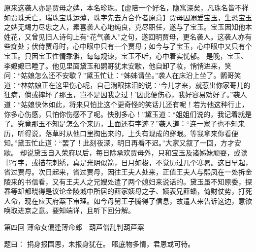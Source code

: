 \documentclass[12pt,oneside]{book}
\begin{document}
原来这袭人亦是贾母之婢，本名珍珠。【虚陪一个好名，隐寓深矣，凡珠名皆不祥如贾珠夭亡，瑞珠宝珠运薄，珠字先去方合作者原意】贾母因溺爱宝玉，生恐宝玉之婢无竭力尽忠之人，素喜袭人心地纯良，克尽职任，遂与了宝玉。宝玉因知他本姓花，又曾见旧人诗句上有“花气袭人”之句，遂回明贾母，更名袭人。这袭人亦有些痴处；伏侍贾母时，心中眼中只有一个贾母；如今与了宝玉，心中眼中又只有个宝玉。只因宝玉性情乖僻，每每规谏，宝玉不听，心中着实忧郁。
是晚，宝玉、李嬷嬷已睡了。他见里面黛玉和鹦哥犹未安歇，他自卸了妆，悄悄进来，笑问：“姑娘怎么还不安歇？”黛玉忙让：“姊姊请坐。”袭人在床沿上坐了。鹦哥笑道：“林姑娘正在这里伤心呢，自己淌眼抹泪的说：‘今儿才来，就惹出你家哥儿的狂病，倘或摔坏了那玉，岂不是因我之过！’因此便伤心，我好容易劝好了。”袭人道：“姑娘快休如此，将来只怕比这个更奇怪的笑话儿还有呢！若为他这种行止，你多心伤感，只怕你伤感不了呢。快别多心！”黛玉道：“姐姐们说的，我记着就是了。究竟那玉不知是怎么个来历，上面还有字迹？”袭人道：“连一家子也不知来历，听得说，落草时从他口里掏出来的，上头有现成的穿眼。等我拿来你看便知。”黛玉忙止道：“罢了！此刻夜深，明日再看不迟。”大家又叙了一回，方才安歇。
却说黛玉自入荣府以后，每日除承欢贾母外，只和宝玉及诸姊妹顽耍，或读书写字，或描花刺绣，真是光阴似箭，日月如梭，不觉历过几个寒暑。这日早起，省过贾母。次日起来，省过贾母，因往王夫人处来，正值王夫人与熙凤在一处拆金陵来的书信看，又有王夫人之兄嫂处遣了两个媳妇来说话的。黛玉虽不知原委，探春等却都晓得是议论金陵城中所居的薛家姨母之子、姨表兄薛蟠，倚财仗势，打死人命，现在应天府案下审理。如今母舅王子腾得了信息，故遣人来告诉这边，意欲唤取进京之意。要知端详，且听下回分解。



 
第四回  薄命女偏逢薄命郎　葫芦僧乱判葫芦案

题曰：
捐身报国恩，未报身犹在。
眼底物多情，君恩或可待。
\end{document}
